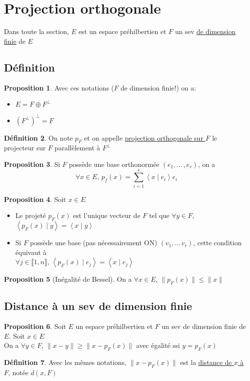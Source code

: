 \documentclass[10pt,a4paper]{article}
\theoremstyle{definition}
\newtheorem{proposition}{Proposition}[section]
\newtheorem{definition}[proposition]{Définition}
\newcommand{\vp}[2]{\left< #1 \mid #2 \right>}
\begin{document}
\section{Projection orthogonale}
Dans toute la section, $E$ est un espace préhilbertien et $F$ un sev \uline{de dimension finie} de $E$
\subsection{Définition}
\begin{proposition}
Avec ces notations ($F$ de dimension finie!) on a:
\begin{itemize}
\item $E = F \oplus F^\perp$
\item $\left(F^\perp\right)^\perp = F$
\end{itemize}
\end{proposition}
\begin{definition}
On note $p_F$ et on appelle \uline{projection orthogonale sur $F$} le projecteur sur $F$ parallèlement à $F^\perp$
\end{definition}
\begin{proposition}
Si $F$ possède une base orthonormée $(e_1, ...\,, e_r)$, on a 
\[\forall x \in E ,\, p_f(x) = \sum\limits_{i = 1}^r \vp{x}{e_i} e_i \]
\end{proposition}
\begin{proposition}
Soit $x \in E$
\begin{itemize}
\item Le projeté $p_F(x)$ est l'unique vecteur de $F$ tel que $\forall y \in F$, $\vp{p_F(x)}{y} = \vp{x}{y}$
\item Si $F$ possède une base (pas nécessairement ON) $(v_1, ...\, v_r)$, cette condition équivaut à \\
$\forall j \in \llbracket 1, n \rrbracket$, $\vp{p_F(x)}{e_j} = \vp{x}{e_j}$
\end{itemize}
\end{proposition}
\begin{proposition}[Inégalité de Bessel]
On a $\forall x \in E$, $\lVert p_F(x) \rVert \leq \lVert x \rVert$
\end{proposition}

\subsection{Distance à un sev de dimension finie}
\begin{proposition}
Soit $E$ un espace préhilbertien et $F$ un sev de dimension finie de $E$. Soit $x \in E$ \\
On a $\forall y \in F$, $\lVert x - y \rVert \geq \lVert x - p_F(x) \rVert$ avec égalité ssi $y = p_F(x)$
\end{proposition}
\begin{definition}
Avec les mêmes notations, $\lVert x - p_F(x) \rVert$ est la \uline{distance de $x$ à $F$}, notée $d(x, F)$
\end{definition}
\end{document}
